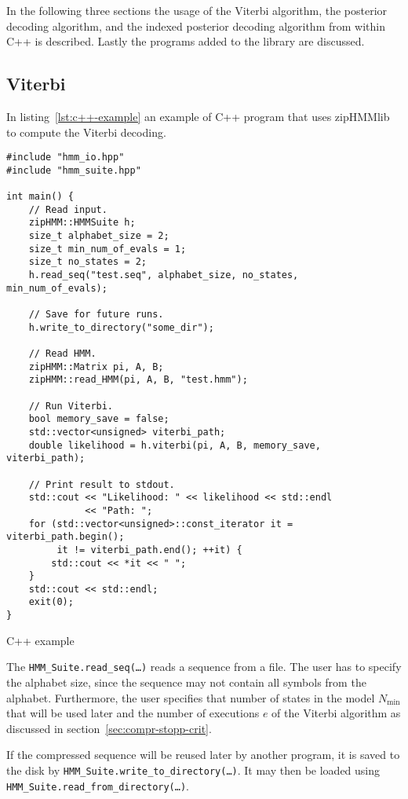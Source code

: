 In the following three sections the usage of the Viterbi algorithm, the
posterior decoding algorithm, and the indexed posterior decoding algorithm from
within C++ is described. Lastly the programs added to the library are
discussed.

\subsection{Viterbi}

In listing~\ref{lst:c++-example} an example of C++ program that uses zipHMMlib
to compute the Viterbi decoding.

\begin{listing}
\begin{verbatim}
#include "hmm_io.hpp"
#include "hmm_suite.hpp"

int main() {
    // Read input.
    zipHMM::HMMSuite h;
    size_t alphabet_size = 2;
    size_t min_num_of_evals = 1;
    size_t no_states = 2;
    h.read_seq("test.seq", alphabet_size, no_states, min_num_of_evals);

    // Save for future runs.
    h.write_to_directory("some_dir");

    // Read HMM.
    zipHMM::Matrix pi, A, B;
    zipHMM::read_HMM(pi, A, B, "test.hmm");

    // Run Viterbi.
    bool memory_save = false;
    std::vector<unsigned> viterbi_path;
    double likelihood = h.viterbi(pi, A, B, memory_save, viterbi_path);

    // Print result to stdout.
    std::cout << "Likelihood: " << likelihood << std::endl
              << "Path: ";
    for (std::vector<unsigned>::const_iterator it = viterbi_path.begin();
         it != viterbi_path.end(); ++it) {
        std::cout << *it << " ";
    }
    std::cout << std::endl;
    exit(0);
}
\end{verbatim}
\caption{C++ example}
\label{lst:c++-example}
\end{listing}

The \texttt{HMM\_Suite.read\_seq(\dots)} reads a sequence from a file. The user
has to specify the alphabet size, since the sequence may not contain all
symbols from the alphabet. Furthermore, the user specifies that number of states
in the model $N_{\min}$ that will be used later and the number of executions
$e$ of the Viterbi algorithm as discussed in
section~\ref{sec:compr-stopp-crit}.

If the compressed sequence will be reused later by another program, it is saved
to the disk by \texttt{HMM\_Suite.write\_to\_directory(\dots)}. It may then be
loaded using \texttt{HMM\_Suite.read\_from\_directory(\dots)}.

